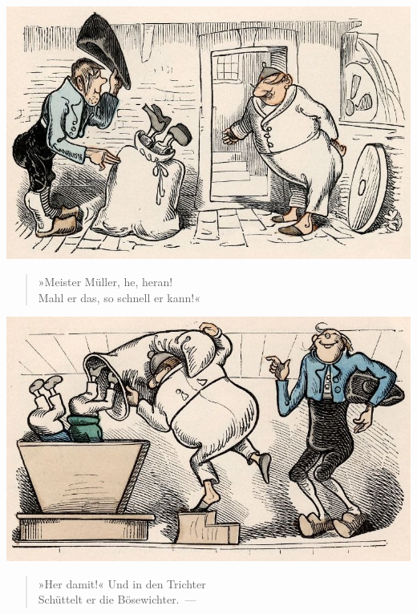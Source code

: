 \documentclass[a4paper,12pt]{article}
\begin{document}
\begin{center}\includegraphics[scale=.7, alt={... zu Meister Müller}]{images/7-08.jpg}\end{center}



\begin{verse}
»Meister Müller, he, heran!\\{}
Mahl er das, so schnell er kann!«
\end{verse}



\begin{center}\includegraphics[scale=.7, alt={... in den Trichter}]{images/7-09.jpg}\end{center}



\begin{verse}
»Her damit!« Und in den Trichter\\{}
Schüttelt er die Bösewichter.~—
\end{verse}
\end{document}
